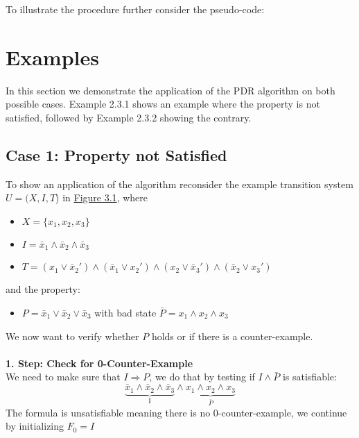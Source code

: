 \documentclass[11pt, a4paper, BCOR=10mm, ngerman]{scrbook}
\begin{document}
\pagebreak

To illustrate the procedure further consider the pseudo-code: \\


\section{Examples}

In this section we demonstrate the application of the PDR algorithm on both possible cases. Example 2.3.1 shows an example where the property is not satisfied, followed by Example 2.3.2 showing the contrary.
 
\subsection{Case 1: Property not Satisfied} 
To show an application of the algorithm reconsider the example transition system $U = (X, I, T$) in \hyperref[ex1]{Figure 3.1}, where \par
\begin{itemize}
\item $X = \{x_1, x_2, x_3\}$
\item $I = \bar x_1 \land \bar x_2 \land \bar x_3$
\item $T = (x_1 \lor \bar x_2' ) \land ( \bar x_1 \lor x_2') \land (x_2 \lor \bar x_3') \land ( \bar x_2 \lor x_3')$
\end{itemize}
and the property: 
\begin{itemize}
\item $P = \bar x_1 \lor \bar x_2 \lor \bar x_3$ with bad state $\bar P = x_1 \land x_2 \land x_3$ 
\end{itemize}
We now want to verify whether $P$ holds or if there is a counter-example. \\ \\

\textbf{1. Step: Check for 0-Counter-Example} \\ We need to make sure that $ I \Rightarrow P$, we do that by testing if $I \land \bar P$ is satisfiable:
\begin{equation*}
\underbrace{\bar x_1 \land \bar x_2 \land \bar x_3}_{\text{I}} \land \underbrace{x_1 \land x_2 \land x_3}_{ \bar P}
\end{equation*}
The formula is unsatisfiable meaning there is no 0-counter-example, we continue by initializing $F_0 = I$ \\ \\  \par
\end{document}
